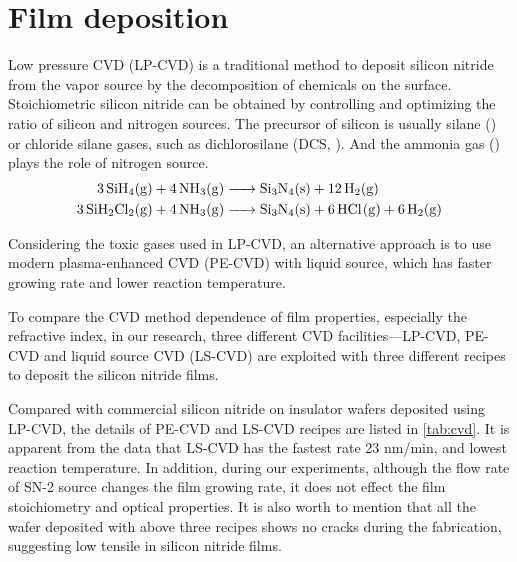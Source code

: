 \section{Film deposition}

Low pressure CVD (LP-CVD) is a traditional method to deposit silicon nitride from the vapor source by the decomposition of chemicals on the surface.  
Stoichiometric silicon nitride can be obtained by controlling and optimizing the ratio of silicon and nitrogen sources. 
The precursor of silicon is usually silane () or chloride silane gases, such as dichlorosilane (DCS, ). And the ammonia gas () plays the role of nitrogen source. 
\begin{align*}
    \ce{3SiH4(g) + 4NH3(g) &-> Si3N4(s) + 12H2(g)} \\
    \ce{3SiH2Cl2(g) + 4NH3(g) &-> Si3N4(s) + 6HCl(g) + 6H2(g)}
\end{align*}

Considering the toxic gases used in LP-CVD, an alternative approach is to use modern plasma-enhanced CVD (PE-CVD) with liquid source, which has faster growing rate and lower reaction temperature. 


To compare the CVD method dependence of film properties, especially the refractive index, in our research, three different CVD facilities---LP-CVD, PE-CVD and liquid source CVD (LS-CVD) are exploited with three different recipes to deposit the silicon nitride films.

Compared with commercial silicon nitride on insulator wafers deposited using LP-CVD,
the details of PE-CVD and LS-CVD recipes are listed in \autoref{tab:cvd}. It is apparent from the data that LS-CVD has the fastest rate 23 nm/min, and lowest reaction temperature. In addition, during our experiments, although the flow rate of SN-2 source changes the film growing rate, it does not effect the film stoichiometry and optical properties. 
It is also worth to mention that all the wafer deposited with above three recipes shows no cracks during the fabrication, suggesting low tensile in silicon nitride films.

